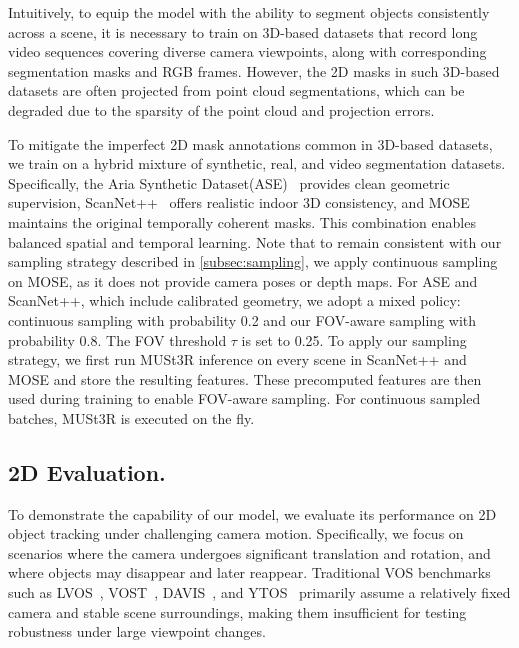 Intuitively, to equip the model with the ability to segment objects consistently across a scene, it is necessary to train on 3D-based datasets that record long video sequences covering diverse camera viewpoints, along with corresponding segmentation masks and RGB frames. However, the 2D masks in such 3D-based datasets are often projected from point cloud segmentations, which can be degraded due to the sparsity of the point cloud and projection errors. 

To mitigate the imperfect 2D mask annotations common in 3D-based datasets, we train on a hybrid mixture of synthetic, real, and video segmentation datasets. Specifically, the Aria Synthetic Dataset(ASE)~\cite{avetisyan2024scenescript} provides clean geometric supervision, ScanNet++~\cite{yeshwanth2023scannet++} offers realistic indoor 3D consistency, and MOSE\cite{MOSE} maintains the original temporally coherent masks. This combination enables balanced spatial and temporal learning. Note that to remain consistent with our sampling strategy described in \cref{subsec:sampling}, we apply continuous sampling on MOSE, as it does not provide camera poses or depth maps.  
For ASE and ScanNet++, which include calibrated geometry, we adopt a mixed policy: continuous sampling with probability 0.2 and our FOV-aware sampling with probability 0.8.  
The FOV threshold $\tau$ is set to 0.25. To apply our sampling strategy, we first run MUSt3R inference on every scene in ScanNet++ and MOSE and store the resulting features. These precomputed features are then used during training to enable FOV-aware sampling.
For continuous sampled batches, MUSt3R is executed on the fly.  



\vspace{-0.5em}
\subsection{2D Evaluation.}
\vspace{-0.5em}

To demonstrate the capability of our model, we evaluate its performance on 2D object tracking under challenging camera motion. 
Specifically, we focus on scenarios where the camera undergoes significant translation and rotation, and where objects may disappear and later reappear.  
Traditional VOS benchmarks such as LVOS~\cite{hong2023lvos}, VOST~\cite{tokmakov2023vost}, DAVIS~\cite{perazzi2017davis}, and YTOS~\cite{xu2018youtube} primarily assume a relatively fixed camera and stable scene surroundings, making them insufficient for testing robustness under large viewpoint changes.


